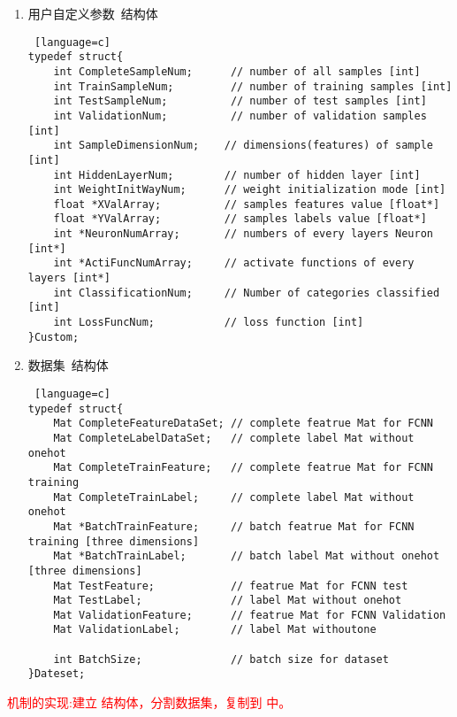 \begin{enumerate}
\begin{lstlisting} [language=c]
	int ClassificationNum;     // Number of categories classified [int]
	int LossFuncNum;           // loss function [int]
}FCNN;
\end{lstlisting}
  \item 用户自定义参数~结构体
\begin{lstlisting} [language=c]
typedef struct{
    int CompleteSampleNum;		// number of all samples [int]
	int TrainSampleNum;			// number of training samples [int]
	int TestSampleNum;			// number of test samples [int]
	int ValidationNum;			// number of validation samples [int]
	int SampleDimensionNum;    // dimensions(features) of sample [int]
	int HiddenLayerNum;        // number of hidden layer [int]
	int WeightInitWayNum;      // weight initialization mode [int]
	float *XValArray;          // samples features value [float*]
	float *YValArray;          // samples labels value [float*]
	int *NeuronNumArray;       // numbers of every layers Neuron [int*]
	int *ActiFuncNumArray;     // activate functions of every layers [int*]
	int ClassificationNum;     // Number of categories classified [int]
	int LossFuncNum;           // loss function [int]
}Custom;
\end{lstlisting}

\item 数据集~结构体
\begin{lstlisting} [language=c]
typedef struct{
	Mat CompleteFeatureDataSet;	// complete featrue Mat for FCNN
	Mat CompleteLabelDataSet;	// complete label Mat without onehot
	Mat CompleteTrainFeature;	// complete featrue Mat for FCNN training
	Mat CompleteTrainLabel;		// complete label Mat without onehot
	Mat *BatchTrainFeature;		// batch featrue Mat for FCNN training [three dimensions]
	Mat *BatchTrainLabel;		// batch label Mat without onehot [three dimensions]
	Mat TestFeature;			// featrue Mat for FCNN test
	Mat TestLabel;				// label Mat without onehot
	Mat ValidationFeature;		// featrue Mat for FCNN Validation
	Mat ValidationLabel;		// label Mat withoutone
	
	int BatchSize;				// batch size for dataset
}Dateset;
\end{lstlisting}
\end{enumerate}




\textcolor{red}{ 机制的实现:建立  结构体，分割数据集，复制到    中。}

